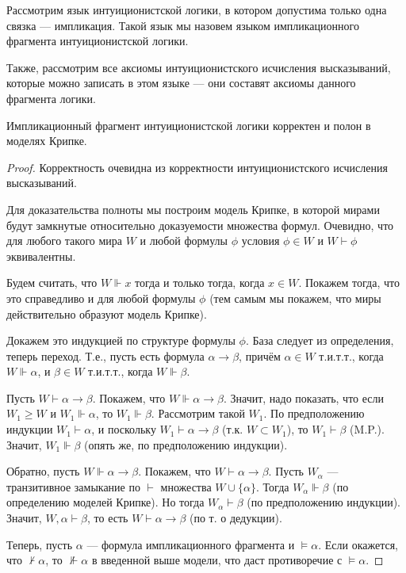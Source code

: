 Рассмотрим язык интуиционистской логики, в котором допустима только одна связка --- импликация.
Такой язык мы назовем языком импликационного фрагмента интуиционистской логики.

Также, рассмотрим все аксиомы интуиционистского исчисления высказываний, которые можно
записать в этом языке --- они составят аксиомы данного фрагмента логики.

\begin{theorem}
Импликационный фрагмент интуиционистской логики корректен и полон в моделях Крипке.
\end{theorem}

\begin{proof}
Корректность очевидна из корректности интуиционистского исчисления высказываний.

Для доказательства полноты мы построим модель Крипке, в которой мирами будут 
замкнутые относительно доказуемости множества формул.
Очевидно, что для любого такого мира $W$ и любой формулы $\phi$ условия 
$\phi \in W$ и $W \vdash \phi$ эквивалентны.

Будем считать, что $W \Vdash x$ тогда и только тогда, когда $x \in W$. 
Покажем тогда, что это справедливо и для любой формулы $\phi$ (тем самым мы
покажем, что миры действительно образуют модель Крипке).

Докажем это индукцией по структуре формулы $\phi$. База следует из определения,
теперь переход. Т.е., пусть есть формула $\alpha\rightarrow\beta$, 
причём $\alpha\in W$ т.и.т.т., когда $W\Vdash\alpha$, и $\beta\in W$ т.и.т.т., когда $W\Vdash\beta$.

Пусть $W\vdash\alpha\rightarrow\beta$. Покажем, что $W\Vdash\alpha\rightarrow\beta$.
Значит, надо показать, что если $W_1 \ge W$ и $W_1\Vdash\alpha$, то $W_1\Vdash\beta$.
Рассмотрим такой $W_1$. По предположению индукции $W_1\vdash\alpha$, и поскольку 
$W_1\vdash\alpha\rightarrow\beta$ (т.к. $W\subset W_1$), то $W_1\vdash\beta$ (M.P.).
Значит, $W_1\Vdash\beta$ (опять же, по предположению индукции).

Обратно, пусть $W\Vdash\alpha\rightarrow\beta$. Покажем, что $W\vdash\alpha\rightarrow\beta$.
Пусть $W_\alpha$ --- транзитивное замыкание по $\vdash$ множества $W \cup \{\alpha\}$.
Тогда $W_\alpha\Vdash\beta$ (по определению моделей Крипке). Но тогда
$W_\alpha\vdash\beta$ (по предположению индукции). Значит, $W,\alpha\vdash\beta$, то есть
$W\vdash\alpha\rightarrow\beta$ (по т. о дедукции). 

Теперь, пусть $\alpha$ --- формула импликационного фрагмента и $\models\alpha$. Если окажется, 
что $\nvdash\alpha$, то $\nVdash\alpha$ в введенной выше модели, что даст противоречие с $\models\alpha$.
\end{proof}

